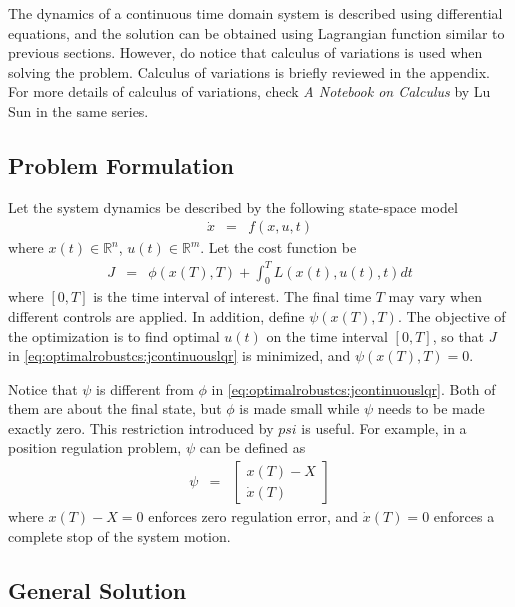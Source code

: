 The dynamics of a continuous time domain system is described using differential equations, and the solution can be obtained using Lagrangian function similar to previous sections. However, do notice that calculus of variations is used when solving the problem. Calculus of variations is briefly reviewed in the appendix. For more details of calculus of variations, check \textit{A Notebook on Calculus} by Lu Sun in the same series.

\subsection{Problem Formulation}

Let the system dynamics be described by the following state-space model
\begin{eqnarray}
	\dot{x} &=& f(x, u, t) \nonumber
\end{eqnarray}
where $x(t)\in \mathbb{R}^n$, $u(t)\in\mathbb{R}^m$. Let the cost function be
\begin{eqnarray}
	J &=& \phi\left(x(T), T\right) + \int_{0}^{T} L\left(x(t), u(t), t\right)dt \label{eq:optimalrobustcs:jcontinuouslqr}
\end{eqnarray}
where $[0, T]$ is the time interval of interest. The final time $T$ may vary when different controls are applied. In addition, define $\psi\left(x(T), T\right)$. The objective of the optimization is to find optimal $u(t)$ on the time interval $[0, T]$, so that $J$ in \eqref{eq:optimalrobustcs:jcontinuouslqr} is minimized, and $\psi\left(x(T), T\right) = 0$.

Notice that $\psi$ is different from $\phi$ in \eqref{eq:optimalrobustcs:jcontinuouslqr}. Both of them are about the final state, but $\phi$ is made small while $\psi$ needs to be made exactly zero. This restriction introduced by $psi$ is useful. For example, in a position regulation problem, $\psi$ can be defined as
\begin{eqnarray}
	\psi &=& \left[\begin{array}{c}
		x(T) - X \\ \dot{x}(T)
	\end{array}\right] \nonumber
\end{eqnarray}
where $x(T) - X=0$ enforces zero regulation error, and $\dot{x}(T)=0$ enforces a complete stop of the system motion.

\subsection{General Solution}

